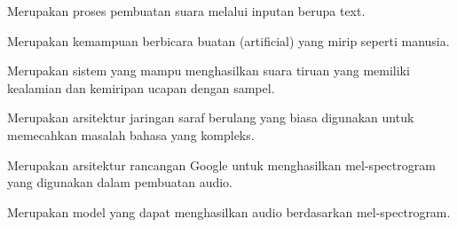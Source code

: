Merupakan proses pembuatan suara melalui inputan berupa text.

Merupakan kemampuan berbicara buatan (artificial) yang mirip seperti manusia.

Merupakan sistem yang mampu menghasilkan suara tiruan yang memiliki kealamian dan kemiripan ucapan dengan sampel.

Merupakan arsitektur jaringan saraf berulang yang biasa digunakan untuk memecahkan masalah bahasa yang kompleks.

Merupakan arsitektur rancangan Google untuk menghasilkan mel-spectrogram yang digunakan dalam pembuatan audio.

Merupakan model yang dapat menghasilkan audio berdasarkan mel-spectrogram.